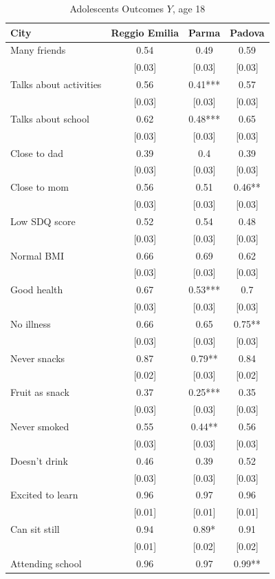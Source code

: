 \documentclass[12pt]{article}
\begin{document}
\begin{table}[ht]
\caption{Adolescents Outcomes $Y$, age 18}
\label{tab:adoOutcomes}%
\begin{tabular}{lccc}
\hline\hline
City & Reggio Emilia & Parma & Padova \\ \hline
Many friends & 0.54 & 0.49 & 0.59 \\ 
& [0.03] & [0.03] & [0.03] \\ 
Talks about activities & 0.56 & 0.41*** & 0.57 \\ 
& [0.03] & [0.03] & [0.03] \\ 
Talks about school & 0.62 & 0.48*** & 0.65 \\ 
& [0.03] & [0.03] & [0.03] \\ 
Close to dad & 0.39 & 0.4 & 0.39 \\ 
& [0.03] & [0.03] & [0.03] \\ 
Close to mom & 0.56 & 0.51 & 0.46** \\ 
& [0.03] & [0.03] & [0.03] \\ 
Low SDQ score & 0.52 & 0.54 & 0.48 \\ 
& [0.03] & [0.03] & [0.03] \\ 
Normal BMI & 0.66 & 0.69 & 0.62 \\ 
& [0.03] & [0.03] & [0.03] \\ 
Good health & 0.67 & 0.53*** & 0.7 \\ 
& [0.03] & [0.03] & [0.03] \\ 
No illness & 0.66 & 0.65 & 0.75** \\ 
& [0.03] & [0.03] & [0.03] \\ 
Never snacks & 0.87 & 0.79** & 0.84 \\ 
& [0.02] & [0.03] & [0.02] \\ 
Fruit as snack & 0.37 & 0.25*** & 0.35 \\ 
& [0.03] & [0.03] & [0.03] \\ 
Never smoked & 0.55 & 0.44** & 0.56 \\ 
& [0.03] & [0.03] & [0.03] \\ 
Doesn't drink & 0.46 & 0.39 & 0.52 \\ 
& [0.03] & [0.03] & [0.03] \\ 
Excited to learn & 0.96 & 0.97 & 0.96 \\ 
& [0.01] & [0.01] & [0.01] \\ 
Can sit still & 0.94 & 0.89* & 0.91 \\ 
& [0.01] & [0.02] & [0.02] \\ 
Attending school & 0.96 & 0.97 & 0.99** \\ 

\end{tabular}
\end{table}
\end{document}
